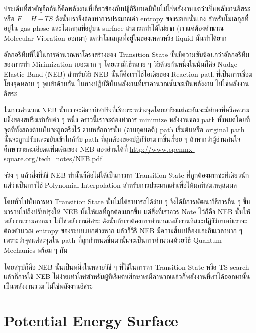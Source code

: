 ประเด็นที่สำคัญอีกอันก็คือพลังงานที่เกี่ยวข้องกับปฏิกิริยาเคมีนั้นไม่ใช่พลังงานแต่ว่าเป็นพลังงานอิสระหรือ $F = H - TS$ 
ดังนั้นเราจึงต้องทำการประมาณค่า entropy ของระบบนั่นเอง สำหรับโมเลกุลที่อยู่ใน gas phase 
และโมเลกุลที่อยู่บน surface สามารถทำได้ไม่ยาก (เราแค่ต้องคำนวณ Molecular Vibration ออกมา) 
แต่ว่าโมเลกุลที่อยู่ในของเหลวหรือ liquid นั้นทำได้ยาก

อัลกอริทึมที่ใช้ในการคำนวณหาโครงสร้างของ Transition State นั้นมีความซับซ้อนกว่าอัลกอริทึมของการทำ 
Minimization เยอะมาก ๆ โดยเรามีวิธีหลาย ๆ วิธีด้วยกันหนึ่งในนั้นก็ึคิอ Nudge Elastic Band (NEB) 
สำหรับวิธี NEB นั้นก็คือเราใช้ไอเดียของ Reaction path ที่เป็นการเชื่อมโยงจุดหลาย ๆ จุดเข้าด้วยกัน 
ในทางปฏิบัตินั้นพลังงานที่เราคำนวณนั้นจะเป็นพลังงาน ไม่ใช่พลังงานอิสระ

ในการคำนวณ NEB นั้นเราจะคิดว่ามีสปริงที่เชื่อมระหว่างจุดโดยสปริงแต่ละอันจะมีค่าคงที่หรือความแข็งของสปริงเท่ากับค่า ๆ หนึ่ง 
คราวนี้เราจะต้องทำการ minimize พลังงานของ path ทั้งหมดโดยที่จุดที่ทั้งสองด้านนั้นจะถูกตรึงไว้ ตามหลักการนั้น 
(ตามอุดมคติ) path เริ่มต้นหรือ original path นั้นจะถูกปรับและขยับเข้าใกล้กับ path ที่ถูกต้องของปฏิกิริยามากขึ้นเรื่อย ๆ 
ถ้าหากว่าผู้อ่านสนใจศึกษารายละเอียดเเพิ่มเติมของ NEB ลองอ่านได้ที่ 
\url{http://www.openmx-square.org/tech_notes/NEB.pdf}

จริง ๆ แล้วสิ่งที่วิธี NEB ทำนั้นก็คือไม่ได้เป็นการหา Transition State ที่ถูกต้องมากซะทีเดียวนักแต่ว่าเป็นการใช้ 
Polynomial Interpolation สำหรับการประมาณค่าเพื่อให้ผลที่สมเหตุสมผล 

โดยทั่วไปนั้นการหา Transition State นั้นไม่ได้สามารถได้ง่าย ๆ จึงได้มีการพัฒนาวิธีการอื่น ๆ ขึ้นมารวมไปถึงปรับปรุงให้ 
NEB นั้นให้ผลที่ถูกต้องมากขึ้น แต่สิ่งที่เราควร Note ไว้ก็คือ NEB นั้นให้พลังงานรวมออกมา ไม่ใช่พลังงานอิสระ 
ดังนั้นถ้าเราต้องการคำนวณพลังงานอิสระปฏิกิริยาเคมีเราจะต้องคำนวณ entropy ของระบบแยกต่างหาก 
แล้วก็วิธี NEB มีความสิ้นเปลืองและกินเวลามาก ๆ เพราะว่าจุดแต่ละจุดใน path ที่ถูกกำหนดขึ้นมานั้นจะเป็นการคำนวณด้วยวิธี 
Quantum Mechanics พร้อม ๆ กัน 

โดยสรุปก็คือ NEB นั้นเป็นหนึ่งในหลายวิธี ๆ ที่ใช้ในการหา Transition State หรือ TS search แล้วก็การใช้ NEB 
ไม่ง่ายเท่าไหร่สำหรับผู้ที่เริ่มต้นศึกษาเคมีคำนวณแล้วก็พลังงานที่เราได้ออกมานั้นเป็นพลังงานรวม ไม่ใช่พลังงานอิสระ 

\section{Potential Energy Surface}

